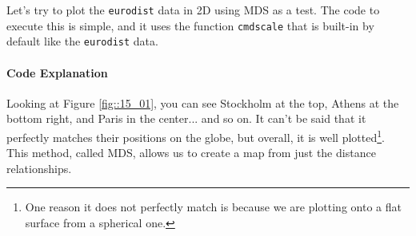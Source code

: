 \documentclass{ltjsbook}
\begin{document}
Let's try to plot the \texttt{eurodist} data in 2D using MDS as a test.
The code to execute this is simple, and it uses the function \texttt{cmdscale} that is built-in by default like the \texttt{eurodist} data.



\paragraph{Code Explanation}




Looking at Figure \ref{fig::15_01}, you can see Stockholm at the top, Athens at the bottom right, and Paris in the center... and so on. It can't be said that it perfectly matches their positions on the globe, but overall, it is well plotted\footnote{ One reason it does not perfectly match is because we are plotting onto a flat surface from a spherical one.}. This method, called MDS, allows us to create a map from just the distance relationships.


\end{document}
